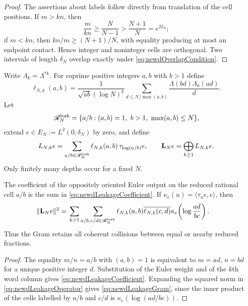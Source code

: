 \begin{proof}
The assertions about labels follow directly from translation of the cell
positions.  If $m>kn$, then
\[
 \frac{m}{kn}\geq\frac N{N-1}>\frac{N+1}{N}=e^{2\delta_N};
\]
if $m<kn$, then $kn/m\geq(N+1)/N$, with equality producing at most an
endpoint contact.  Hence integer and noninteger cells are orthogonal.
Two intervals of length $\delta_N$ overlap exactly under
\eqref{eq:newdOverlapCondition}.
\end{proof}

Write $\Lambda_k=\Lambda^{*k}$.  For coprime positive integers $a,b$ with
$b>1$ define
\begin{equation}\label{eq:newdLeakageCoefficient}
 \ell_{N,k}(a,b)=
 \frac1{\sqrt{ab}(\log N)^k}
 \sum_{d\leq N/\max(a,b)}
       \frac{\Lambda(bd)\Lambda_k(ad)}d.
\end{equation}
Let
\[
 \mathscr R_N^{\rm leak}
 =\{a/b:(a,b)=1,\ b>1,\ \max(a,b)\leq N\},
\]
extend $e\in E_N:=L^2(0,\delta_N)$ by zero, and define
\begin{equation}\label{eq:newdLeakageOperator}
 L_{N,k}e=\sum_{a/b\in\mathscr R_N^{\rm leak}}
   \ell_{N,k}(a,b)\,\tau_{\log(a/b)}e,
 \qquad
 \mathbf L_Ne=\bigoplus_{k\geq1}L_{N,k}e.
\end{equation}
Only finitely many depths occur for a fixed $N$.

\begin{proposition}
\label{prop:newdRationalAggregation}
The coefficient of the oppositely oriented Euler output on the reduced
rational cell $a/b$ is the sum in
\eqref{eq:newdLeakageCoefficient}.  If
$\kappa_e(u)=\langle\tau_ue,e\rangle$, then
\begin{align}
 \|\mathbf L_Ne\|^2
 ={}&\sum_{k\geq1}
 \sum_{a/b,c/d\in\mathscr R_N^{\rm leak}}
 \ell_{N,k}(a,b)\overline{\ell_{N,k}(c,d)}
 \kappa_e\!\left(\log\frac{ad}{bc}\right).
 \label{eq:newdLeakageGram}
\end{align}
Thus the Gram retains all coherent collisions between equal or nearby
reduced fractions.
\end{proposition}

\begin{proof}
The equality $m/n=a/b$ with $(a,b)=1$ is equivalent to
$m=ad$, $n=bd$ for a unique positive integer $d$.  Substitution of the
Euler weight and of the $k$th word column gives
\eqref{eq:newdLeakageCoefficient}.  Expanding the squared norm in
\eqref{eq:newdLeakageOperator} gives
\eqref{eq:newdLeakageGram}, since the inner product of the cells labelled by
$a/b$ and $c/d$ is $\kappa_e(\log(ad/bc))$.
\end{proof}

